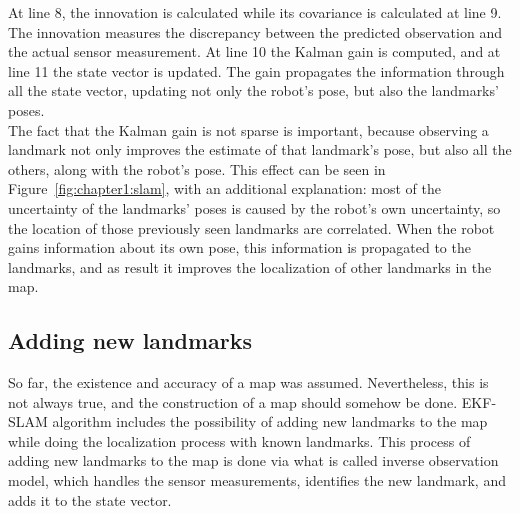 At line 8, the innovation is calculated while its covariance is calculated at line 9. The innovation measures the discrepancy between the predicted observation and the actual sensor measurement. At line 10 the Kalman gain is computed, and at line 11 the state vector is updated. The gain propagates the information through all the state vector, updating not only the robot's pose, but also the landmarks' poses.\\

The fact that the Kalman gain is not sparse is important, because observing a landmark not only improves the estimate of that landmark's pose, but also all the others, along with the robot's pose. This effect can be seen in Figure~\ref{fig:chapter1:slam}, with an additional explanation: most of the uncertainty of the landmarks' poses is caused by the robot's own uncertainty, so the location of those previously seen landmarks are correlated. When the robot gains information about its own pose, this information is propagated to the landmarks, and as result it improves the localization of other landmarks in the map.

\subsection{Adding new landmarks}
\label{subsec:chapter1:slam:ekfslam:addlandmarks}
So far, the existence and accuracy of a map was assumed. Nevertheless, this is not always true, and the construction of a map should somehow be done. EKF-SLAM algorithm includes the possibility of adding new landmarks to the map while doing the localization process with known landmarks. This process of adding new landmarks to the map is done via what is called inverse observation model, which handles the sensor measurements, identifies the new landmark, and adds it to the state vector.\\

